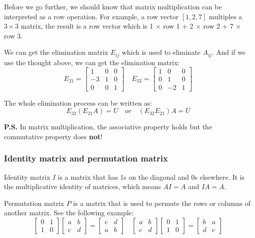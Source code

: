\documentclass[12pt]{ctexart}
\begin{document}
Before we go further, we should know that matrix multiplication can be interpreted as
a row operation. For example, a row vector $[1, 2, 7]$ multiples a $3 \times 3$ matrix,
the result is a row vector which is 1 $\times$ row 1 + 2 $\times$ row 2 + 7 $\times$
row 3.

We can get the elimination matrix $E_{ij}$ which is used to eliminate $A_{ij}$. And if
we use the thought above, we can get the elimination matrix:
\[
  E_{21} = \begin{bmatrix}
    1 & 0 & 0 \\
    -3 & 1 & 0 \\
    0 & 0 & 1
  \end{bmatrix}
  \quad
  E_{32} = \begin{bmatrix}
    1 & 0 & 0 \\
    0 & 1 & 0 \\
    0 & -2 & 1
  \end{bmatrix}
\]

The whole elimination process can be written as:
\[
  E_{32} (E_{21} A) = U \quad or \quad (E_{32} E_{21}) A = U
\]

\textbf{P.S.} In matrix multiplication, the associative property holds but the
commutative property does \textbf{not}!

\subsubsection{\textbf{Identity matrix and permutation matrix}}

Identity matrix $I$ is a matrix that has 1s on the diagonal and 0s elsewhere. It is
the multiplicative identity of matrices, which means $AI = A$ and $IA = A$.

Permutation matrix $P$ is a matrix that is used to permute the rows or columns of
another matrix. See the following example:
\[
  \begin{bmatrix}
    0 & 1 \\
    1 & 0
  \end{bmatrix}
  \begin{bmatrix}
    a & b \\
    c & d
  \end{bmatrix}
  =
  \begin{bmatrix}
    c & d \\
    a & b
  \end{bmatrix}
  \quad
  \begin{bmatrix}
    a & b \\
    c & d
  \end{bmatrix}
  \begin{bmatrix}
    0 & 1 \\
    1 & 0
  \end{bmatrix}
  =
  \begin{bmatrix}
    b & a \\
    d & c
  \end{bmatrix}
\]
\end{document}
